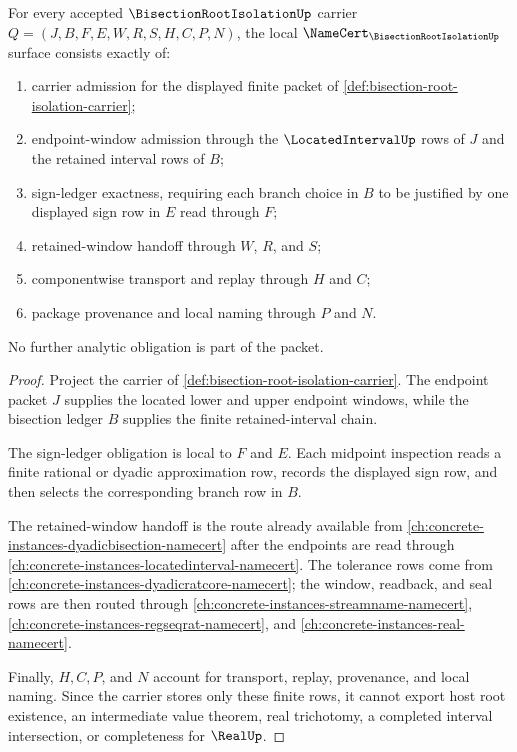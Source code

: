 \begin{theorem}
\label{thm:bisection-root-isolation-namecert-obligations}
For every accepted $\BisectionRootIsolationUp$ carrier $Q=(J,B,F,E,W,R,S,H,C,P,N)$, the local $\NameCert_{\BisectionRootIsolationUp}$ surface consists exactly of:
\begin{enumerate}
\item carrier admission for the displayed finite packet of \autoref{def:bisection-root-isolation-carrier};
\item endpoint-window admission through the $\LocatedIntervalUp$ rows of $J$ and the retained interval rows of $B$;
\item sign-ledger exactness, requiring each branch choice in $B$ to be justified by one displayed sign row in $E$ read through $F$;
\item retained-window handoff through $W$, $R$, and $S$;
\item componentwise transport and replay through $H$ and $C$;
\item package provenance and local naming through $P$ and $N$.
\end{enumerate}
No further analytic obligation is part of the packet.
\end{theorem}
\begin{proof}
Project the carrier of \autoref{def:bisection-root-isolation-carrier}. The endpoint packet $J$ supplies the located lower and upper endpoint windows, while the bisection ledger $B$ supplies the finite retained-interval chain.

The sign-ledger obligation is local to $F$ and $E$. Each midpoint inspection reads a finite rational or dyadic approximation row, records the displayed sign row, and then selects the corresponding branch row in $B$.

The retained-window handoff is the route already available from \autoref{ch:concrete-instances-dyadicbisection-namecert} after the endpoints are read through \autoref{ch:concrete-instances-locatedinterval-namecert}. The tolerance rows come from \autoref{ch:concrete-instances-dyadicratcore-namecert}; the window, readback, and seal rows are then routed through \autoref{ch:concrete-instances-streamname-namecert}, \autoref{ch:concrete-instances-regseqrat-namecert}, and \autoref{ch:concrete-instances-real-namecert}.

Finally, $H,C,P$, and $N$ account for transport, replay, provenance, and local naming. Since the carrier stores only these finite rows, it cannot export host root existence, an intermediate value theorem, real trichotomy, a completed interval intersection, or completeness for $\RealUp$.
\end{proof}

